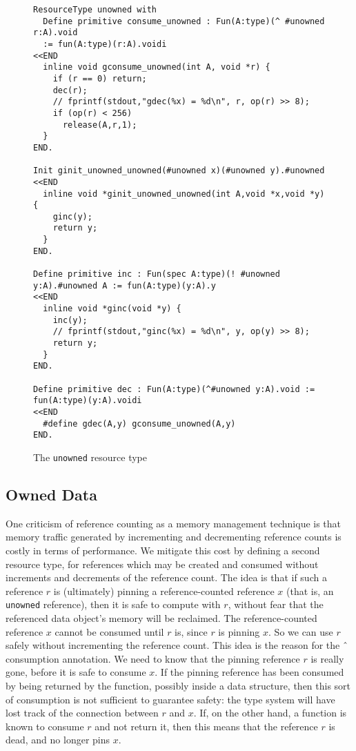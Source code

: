 \documentclass[9pt,natbib]{sigplanconf}
\begin{document}
\begin{figure*}
\small
\begin{verbatim}
ResourceType unowned with
  Define primitive consume_unowned : Fun(A:type)(^ #unowned r:A).void 
  := fun(A:type)(r:A).voidi
<<END
  inline void gconsume_unowned(int A, void *r) {
    if (r == 0) return;
    dec(r);
    // fprintf(stdout,"gdec(%x) = %d\n", r, op(r) >> 8);
    if (op(r) < 256)
      release(A,r,1);
  }
END.

Init ginit_unowned_unowned(#unowned x)(#unowned y).#unowned 
<<END
  inline void *ginit_unowned_unowned(int A,void *x,void *y) {
    ginc(y);
    return y;
  }
END.

Define primitive inc : Fun(spec A:type)(! #unowned y:A).#unowned A := fun(A:type)(y:A).y 
<<END
  inline void *ginc(void *y) {
    inc(y);
    // fprintf(stdout,"ginc(%x) = %d\n", y, op(y) >> 8);
    return y;
  }
END.

Define primitive dec : Fun(A:type)(^#unowned y:A).void := fun(A:type)(y:A).voidi 
<<END
  #define gdec(A,y) gconsume_unowned(A,y)
END.
\end{verbatim}
\caption{The \texttt{unowned} resource type}
\label{fig:unowned}
\end{figure*}

\subsection{Owned Data}

One criticism of reference counting as a memory management technique
is that memory traffic generated by incrementing and decrementing
reference counts is costly in terms of performance.  We mitigate this
cost by defining a second resource type, for references which may be
created and consumed without increments and decrements of the
reference count.  The idea is that if such a reference $r$ is
(ultimately) pinning a reference-counted reference $x$ (that is, an
\texttt{unowned} reference), then it is safe to compute with $r$,
without fear that the referenced data object's memory will be
reclaimed.  The reference-counted reference $x$ cannot be consumed
until $r$ is, since $r$ is pinning $x$.  So we can use $r$ safely
without incrementing the reference count.  This idea is the reason for
the \^{\ } consumption annotation.  We need to know that the
pinning reference $r$ is really gone, before it is safe to consume
$x$.  If the pinning reference has been consumed by being returned by
the function, possibly inside a data structure, then this sort of
consumption is not sufficient to guarantee safety: the type system
will have lost track of the connection between $r$ and $x$.  If, on
the other hand, a function is known to consume $r$ and not return it,
then this means that the reference $r$ is dead, and no longer pins
$x$.
\end{document}
